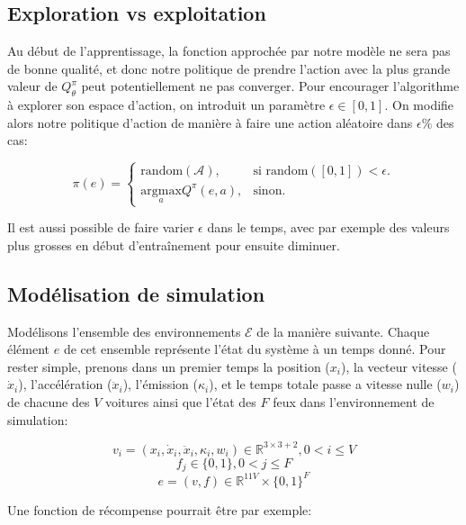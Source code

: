\documentclass[11pt]{article}
\begin{document}
\subsection{Exploration vs exploitation}
\label{sec:org6f9316a}

Au début de l'apprentissage, la fonction approchée par notre modèle ne sera pas
de bonne qualité, et donc notre politique de prendre l'action avec la plus
grande valeur de \(Q^\pi_\theta\) peut potentiellement ne pas converger. Pour
encourager l'algorithme à explorer son espace d'action, on introduit un
paramètre \(\epsilon \in [0,1]\). On modifie alors notre politique d'action de
manière à faire une action aléatoire dans \(\epsilon\%\) des cas:

\begin{latex}
\[
\pi(e)=\begin{cases}
    \mathrm{random}(\mathcal{A}), & \text{si $\mathrm{random}([0,1])<\epsilon$}.\\
    \underset{a}{\mathrm{argmax}} Q^\pi(e, a), & \text{sinon}.
  \end{cases}
\]
\end{latex}


Il est aussi possible de faire varier \(\epsilon\) dans le temps, avec par exemple des valeurs plus grosses en début d'entraînement pour ensuite diminuer.

\subsection{Modélisation de simulation}
\label{sec:orga7a23c1}

Modélisons l'ensemble des environnements \(\mathcal{E}\) de la manière suivante. Chaque élément \(e\) de cet ensemble représente l'état du système à un temps
donné. Pour rester simple, prenons dans un premier temps la position (\(x_i\)), la vecteur vitesse (\(\dot{x}_i\)), l'accélération (\(\ddot{x}_i\)), l'émission (\(\kappa_i\)), et le temps totale passe a vitesse nulle (\(w_i\)) de chacune des \(V\) voitures ainsi que l'état des \(F\) feux dans l'environnement de simulation:

\begin{latex}
\[v_i = (x_i, \dot{x}_i, \ddot{x}_i, \kappa_i, w_i) \in \mathbb{R}^{3\times3+2}, 0 < i \leq V\]
\[f_j \in \{0,1\}, 0 < j \leq F\]
\[e = (v, f) \in \mathbb{R}^{11V}\times\{0,1\}^F\]
\end{latex}

Une fonction de récompense pourrait être par exemple:
\end{document}
